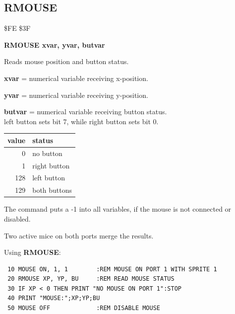 \subsection{RMOUSE}
\begin{description}[leftmargin=2cm,style=nextline]
\item [Token:] \$FE \$3F
\item [Format:] {\bf RMOUSE xvar, yvar, butvar}
\item [Usage:] Reads mouse position and button status.

               {\bf xvar} = numerical variable receiving x-position.

               {\bf yvar} = numerical variable receiving y-position.

               {\bf butvar} = numerical variable receiving button status. \\
               left button sets bit 7, while right button sets bit 0.

{\setlength{\tabcolsep}{1mm}
\ttfamily
\begin{tabular}{|r|l|}
\hline
 value  & status \\
\hline
  0 & no button \\
  1 & right button \\
128 & left button \\
129 & both buttons \\
\hline
\end{tabular}
}

The command puts a -1 into all variables,
if the mouse is not connected or disabled.

\item [Remarks:] Two active mice on both ports merge the results.
\item [Example:] Using {\bf RMOUSE}:
\begin{tcolorbox}[colback=black,coltext=white]
\verbatimfont{\codefont}
\begin{verbatim}
 10 MOUSE ON, 1, 1        :REM MOUSE ON PORT 1 WITH SPRITE 1
 20 RMOUSE XP, YP, BU     :REM READ MOUSE STATUS
 30 IF XP < 0 THEN PRINT "NO MOUSE ON PORT 1":STOP
 40 PRINT "MOUSE:";XP;YP;BU
 50 MOUSE OFF             :REM DISABLE MOUSE
\end{verbatim}
\end{tcolorbox}
\end{description}


\newpage
